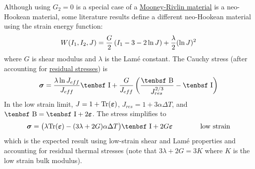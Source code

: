 \documentclass[11pt]{book}
\newcommand{\tens}[1]{\boldsymbol{\mathsf{#1}}}
\def\B{\hbox{\tenbsf B}}
\def\I{\hbox{\tenbsf I}}
\def\Jeff{J_{eff}}
\def\Jres{J_{res}}
\begin{document}
Although using $G_2=0$ is a special case of a \hyperref[MRM]{Mooney-Rivlin material} is a neo-Hookean material, some literature results define a different neo-Hookean material using the strain energy function:
\begin{equation}
W(I_1,I_2,J)= {G\over2}\left(I_1-3-2\ln J\right)  + {\lambda\over2}(\ln J)^2
\end{equation}
where $G$ is shear modulus and $\lambda$ is the Lam\'e constant. The Cauchy stress (after accounting for \hyperref[HyperRes]{residual stresses}) is
\begin{equation}
\tens\sigma = {\lambda \ln \Jeff\over \Jeff}\I + {G\over \Jeff}\left({\B\over \Jres^{2/3}} - \I\right) 
\end{equation}
In the low strain limit, $J= 1+{\rm Tr}(\tens\varepsilon)$, $\Jres=1+3\alpha\Delta T$, and $\B = \I + 2\tens\varepsilon$. The stress simplifies to
\begin{equation}
\tens\sigma = \bigl(\lambda{\rm Tr}(\tens\varepsilon)- (3\lambda+2G)\alpha\Delta T\bigr)\I + 2G \tens\varepsilon \qquad\qquad {\rm low\ strain} 
\end{equation}
which is the expected result using low-strain shear and Lam\'e properties and accounting for residual thermal stresses (note that $3\lambda+2G = 3K$ where $K$ is the low strain bulk modulus). 
\end{document}
